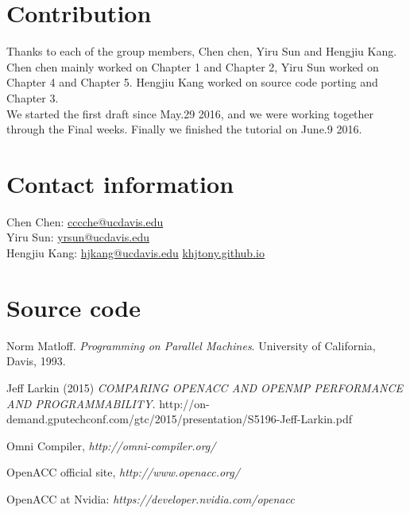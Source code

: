 \documentclass[ebook,10pt,oneside,openany]{memoir}
\begin{document}
\begin{appendices}
\chapter{Contribution}
Thanks to each of the group members, Chen chen, Yiru Sun and Hengjiu Kang. \\
Chen chen mainly worked on Chapter 1 and Chapter 2, Yiru Sun worked on Chapter 4 and Chapter 5. Hengjiu Kang worked on source code porting and Chapter 3.\\
We started the first draft since May.29 2016, and we were working together through the Final weeks. Finally we finished the tutorial on June.9 2016.

\chapter{Contact information}
Chen Chen: \href{mailto:cccche@ucdavis.edu}{cccche@ucdavis.edu} \\
Yiru Sun: \href{mailto:yrsun@ucdavis.edu}{yrsun@ucdavis.edu} \\
Hengjiu Kang: \href{mailto:hjkang@ucdavis.edu}{hjkang@ucdavis.edu}  \url{khjtony.github.io}

\chapter{Source code}











\end{appendices}


\begin{thebibliography}{9}
Norm Matloff. 
\textit{Programming on Parallel Machines}. 
University of California, Davis, 1993.

Jeff Larkin (2015)
\textit{COMPARING OPENACC AND OPENMP PERFORMANCE AND PROGRAMMABILITY.} http://on-demand.gputechconf.com/gtc/2015/presentation/S5196-Jeff-Larkin.pdf

Omni Compiler,
\textit{http://omni-compiler.org/}

OpenACC official site, 
\textit{http://www.openacc.org/}

OpenACC at Nvidia:
\textit{https://developer.nvidia.com/openacc}



\end{thebibliography}
 
\end{document}
